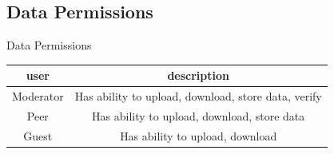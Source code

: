 \documentclass{beamer}
\begin{document}
\subsection{Data Permissions}
\begin{frame}{Data Permissions}


\begin{center}
\begin{tabular}{c|c}
\hline
    user & description \\
\hline
\hline
   Moderator & Has ability to upload, download, store data, verify \\
    Peer & Has ability to upload, download, store data \\
    Guest & Has ability to upload, download \\

\end{tabular}
\end{center}

\end{frame}


\end{document}
